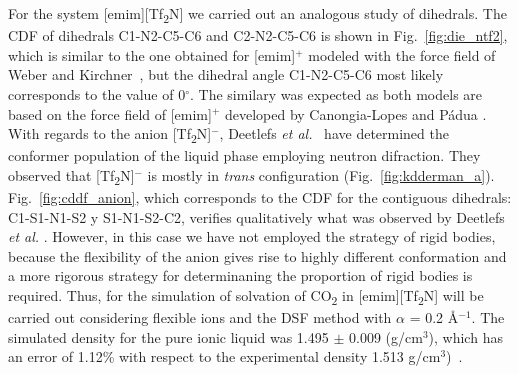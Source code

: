 \documentclass[3p,twocolumn]{elsarticle}
\begin{document}
For the system [emim][Tf\textsubscript{2}N] we carried out an analogous study of dihedrals. The CDF of dihedrals C1-N2-C5-C6 and C2-N2-C5-C6 is shown in Fig.~\ref{fig:die_ntf2}, which is similar to the one obtained for [emim]$^{+}$ modeled with the force field of Weber and Kirchner~\cite{Weber_2016}, but  the dihedral angle C1-N2-C5-C6 most likely corresponds to the value of 0$^{\circ}$. The similary was expected as both models are based on the force field of [emim]$^{+}$ developed by Canongia-Lopes and Pádua \cite{Canongia_Lopes_2006}. With regards to the anion [Tf\textsubscript{2}N]$^{-}$, Deetlefs \textit{et al.}~\cite{Deetlefs_2006} have determined the conformer population of the liquid phase employing neutron difraction. They observed that [Tf\textsubscript{2}N]$^{-}$ is mostly in \textit{trans} configuration (Fig.~\ref{fig:kdderman_a}). Fig.~\ref{fig:cddf_anion}, which corresponds to the CDF for the contiguous dihedrals: C1-S1-N1-S2 y S1-N1-S2-C2, verifies qualitatively what was observed by Deetlefs \textit{et al.} \cite{Deetlefs_2006}. However, in this case we have not employed the strategy of rigid bodies, because the flexibility of the anion gives rise to highly different conformation and a more rigorous strategy for determinaning the proportion of rigid bodies is required.  Thus, for the simulation of solvation of CO\textsubscript{2} in  [emim][Tf\textsubscript{2}N] will be carried out considering flexible ions and the DSF method with $\alpha$ = 0.2 {\AA}$^{-1}$. The simulated density for the pure ionic liquid was 1.495 $\pm$ 0.009 (g/cm$^3$), which has an error of 1.12\% with respect to the experimental density 1.513 g/cm$^3$)~\cite{Tokuda_2005}.
\end{document}
